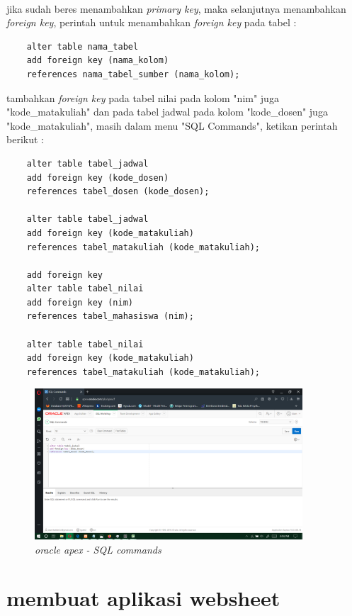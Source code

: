 \documentclass[12pt]{ociamthesis}  %
\begin{document}
\paragraph{}
jika sudah beres menambahkan \textit{primary key}, maka selanjutnya menambahkan \textit{foreign key}, perintah untuk menambahkan \textit{foreign key} pada tabel :
	\begin{verbatim}
	alter table nama_tabel
	add foreign key (nama_kolom)
	references nama_tabel_sumber (nama_kolom);
    \end{verbatim}
tambahkan \textit{foreign key} pada tabel nilai pada kolom "nim" juga "kode\_matakuliah" dan pada tabel jadwal pada kolom "kode\_dosen" juga "kode\_matakuliah", masih dalam menu "SQL Commands", ketikan perintah berikut :
	\begin{verbatim}
	alter table tabel_jadwal
	add foreign key (kode_dosen)
	references tabel_dosen (kode_dosen);

	alter table tabel_jadwal
	add foreign key (kode_matakuliah)
	references tabel_matakuliah (kode_matakuliah);

	add foreign key
	alter table tabel_nilai
	add foreign key (nim)
	references tabel_mahasiswa (nim);

	alter table tabel_nilai
	add foreign key (kode_matakuliah)
	references tabel_matakuliah (kode_matakuliah);
    \end{verbatim}
    \begin{figure}[H]
    \centering
	\includegraphics[width=10cm]{figures/SQL commands/Screenshot (233).png} 
    \caption{\textit{oracle apex - SQL commands}}
    \label{foto21}
 	\end{figure}	
\section{membuat aplikasi websheet}
\end{document}
